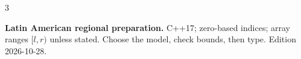 \documentclass[9pt,a4paper,notitlepage]{extreport}
\begin{document}
\setlength{\parskip}{2pt}
\setlength{\abovedisplayskip}{3pt}
\setlength{\belowdisplayskip}{3pt}
\setlength{\abovedisplayshortskip}{2pt}
\setlength{\belowdisplayshortskip}{2pt}
\begin{multicols*}{3}
\raggedcolumns
{}\par
\textbf{Latin American regional preparation.} C++17; zero-based indices;
array ranges $[l,r)$ unless stated. Choose the model, check bounds, then type.
Edition 2026-10-28.\par
\tableofcontents
\thispagestyle{fancy}
\end{multicols*}
\end{document}
